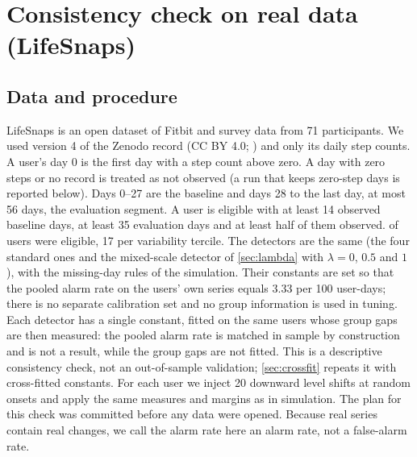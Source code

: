 \documentclass[11pt,a4paper]{article}
\begin{document}


\FloatBarrier
\section{Consistency check on real data (LifeSnaps)}\label{sec:ls}
\subsection{Data and procedure}
LifeSnaps \citep{yfantidou2022} is an open dataset of Fitbit and survey data from 71 participants. We used version 4 of the Zenodo record (CC BY 4.0; \citealp{lifesnaps_zenodo}) and only its daily step counts.
A user's day 0 is the first day with a step count above zero. A day with zero steps or no record is treated as not observed (a run that keeps zero-step days is reported below). Days 0--27 are the baseline and days 28 to the last day, at most 56 days, the evaluation segment. A user is eligible with at least 14 observed baseline days, at least 35 evaluation days and at least half of them observed. \LsEligible{} of \LsTotal{} users were eligible, 17 per variability tercile.
The detectors are the same (the four standard ones and the mixed-scale detector of \cref{sec:lambda} with $\lambda=0$, $0.5$ and $1$), with the missing-day rules of the simulation. Their constants are set so that the pooled alarm rate on the users' own series equals 3.33 per 100 user-days; there is no separate calibration set and no group information is used in tuning. Each detector has a single constant, fitted on the same users whose group gaps are then measured: the pooled alarm rate is matched in sample by construction and is not a result, while the group gaps are not fitted. This is a descriptive consistency check, not an out-of-sample validation; \cref{sec:crossfit} repeats it with cross-fitted constants. For each user we inject 20 downward level shifts at random onsets and apply the same measures and margins as in simulation. The plan for this check was committed before any data were opened.
Because real series contain real changes, we call the alarm rate here an alarm rate, not a false-alarm rate.
\end{document}
